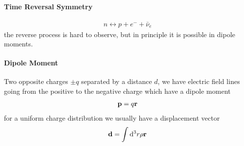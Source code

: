 \documentclass[../main.tex]{subfiles}
\begin{document}
\paragraph*{Time Reversal Symmetry}
\begin{align*}
    n \leftrightarrow p + e^- + \bar \nu_e
\end{align*}
the reverse process is hard to observe, but in principle it is possible in dipole moments.
\paragraph*{Dipole Moment} Two opposite charges $\pm q$ separated by a distance $d$, we have
electric field lines going from the positive to the negative charge which have a dipole moment
\begin{align*}
    \vb p = q\vb r
\end{align*}
for a uniform charge distribution we usually have a displacement vector
\begin{align*}
    \vb d = \int \dd^3 r \rho \vb r
\end{align*}
\end{document}
